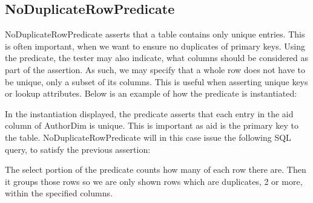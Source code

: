\subsection{NoDuplicateRowPredicate}
NoDuplicateRowPredicate asserts that a table contains only unique entries. This is often important, when we want to ensure no duplicates of primary keys. Using the predicate, the tester may also indicate, what columns should be considered as part of the assertion. As such, we may specify that a whole row does not have to be unique, only a subset of its columns. This is useful when asserting unique keys or lookup attributes. Below is an example of how the predicate is instantiated:

In the instantiation displayed, the predicate asserts that  each entry in the aid column of AuthorDim is unique. This is important as aid is the primary key to the table. 
NoDuplicateRowPredicate will in this case issue the following SQL query, to satisfy the previous assertion:


The select portion of the predicate counts how many of each row there are. Then it groups those rows so we are only shown rows which are duplicates, 2 or more, within the specified columns.


